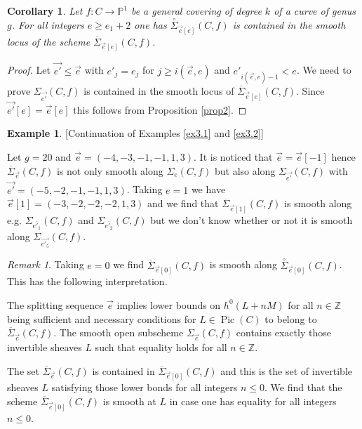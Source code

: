 \documentclass{article}
\DeclareMathOperator{\Pic}{Pic}
\newtheorem{corollary}{Corollary}
\theoremstyle{definition}
\newtheorem{example}{Example}
\theoremstyle{remark}
\newtheorem{remark}{Remark}
\begin{document}
\begin{corollary}\label{cor3.1}
Let $f:C \rightarrow \mathbb{P}^1$ be a general covering of degree $k$ of a curve of genus $g$.
For all integers $e \geq e_1+2$ one has $\overset{\circ}{\Sigma}_{\overrightarrow {e}[e]}(C,f)$ is contained in the smooth locus of the scheme $\overline{ \Sigma}_{\overrightarrow {e}[e]}(C,f)$.
\end{corollary}

\begin{proof}
Let $\overrightarrow {e'} \leq \overrightarrow {e}$ with $e'_j =e_j$ for $j \geq i(\overrightarrow {e},e)$ and $e'_{i(\overrightarrow {e},e)-1} <e$.
We need to prove $\Sigma _{\overrightarrow {e'}}(C,f)$ is contained in the smooth locus of $\overline{\Sigma}_{\overrightarrow {e}[e]}(C,f)$.
Since $\overrightarrow {e'}[e]=\overrightarrow {e}[e]$ this follows from Proposition \ref{prop2}.
\end{proof}

\begin{example}\label{ex3.3}[Continuation of Examples \ref{ex3.1} and \ref{ex3.2}]

Let $g=20$ and $\overrightarrow {e}=(-4,-3,-1,-1,1,3)$.
It is noticed that $\overrightarrow {e}=\overrightarrow {e}[-1]$ hence $\overline{\Sigma}_{\overrightarrow {e}}(C,f)$ is not only smooth along $\Sigma _{e}(C,f)$ but also along $\Sigma_{\overrightarrow {e'}}(C,f)$ with $\overrightarrow {e'}=(-5,-2,-1,-1,1,3)$.
Taking $e=1$ we have $\overrightarrow {e}[1]=(-3,-2,-2,-2,1,3)$ and we find that $\overline{\Sigma}_{\overrightarrow {e}[1]}(C,f)$ is smooth along e.g. $\Sigma_{\overline{e'_1}}(C,f)$ and $\Sigma_{\overline{e'_2}}(C,f)$ but we don't know whether or not it is smooth along $\Sigma_{\overrightarrow{e'_5}}(C,f)$.
\end{example}

\begin{remark}\label{final}
Taking $e=0$ we find $\overline{\Sigma}_{\overrightarrow {e}[0]}(C,f)$ is smooth along $\overset{\circ}{\Sigma}_{\overrightarrow {e}[0]}(C,f)$.
This has the following interpretation.

The splitting sequence $\overrightarrow{e}$ implies lower bounds on $h^0(L+nM)$ for all $n \in \mathbb{Z}$ being sufficient and necessary conditions for $L \in \Pic (C)$ to belong to $\overline{\Sigma}_{\overrightarrow {e}}(C,f)$.
The smooth open subscheme $\Sigma_{\overrightarrow {e}}(C,f)$ contains exactly those invertible sheaves $L$ such that equality holds for all $n \in \mathbb{Z}$.

The set $\overline{\Sigma}_{\overrightarrow {e}}(C,f)$ is contained in $\overline{\Sigma}_{\overrightarrow {e}[0]}(C,f)$ and this is the set of invertible sheaves $L$ satisfying those lower bonds for all integers $n \leq 0$.
We find that the scheme $\overline{\Sigma}_{\overrightarrow {e}[0]}(C,f)$ is smooth at $L$ in case one has equality for all integers $n \leq 0$.

\end{remark}
\end{document}
